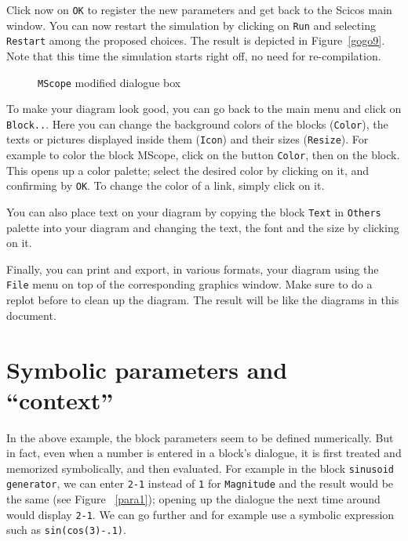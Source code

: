 \documentclass{book}
\begin{document}
Click now on {\tt OK} to register the new parameters and get back to the Scicos main window.
You can now restart the simulation by clicking on {\tt Run} and 
selecting {\tt Restart} among the proposed choices. The result is
depicted in Figure~\ref{gogo9}. Note that
this time the simulation starts right off, no need for re-compilation.
  \begin{figure}[hbtp]
  \centerline{}
  \caption{{\tt MScope} modified dialogue box}
 \label{gogo8}
  \end{figure}



\bigskip

To make your diagram look good, you can go back to the main menu and 
click on {\tt Block..}. Here you can change the background colors of the blocks
({\tt Color}), the texts or pictures displayed inside them ({\tt Icon}) and their
sizes ({\tt Resize}). For example to color the block MScope, click on the
button {\tt Color}, then on the block. This opens up a color palette; 
select the desired color by clicking on it, and confirming by {\tt OK}.
To change the color of a link, simply click on it.

You can also place text on your diagram by copying the block {\tt Text} in
{\tt Others} palette into your diagram and changing the text, the font and
the size by clicking on it.

Finally, you can print and export, in various formats, your diagram using
the {\tt File} menu on top of the corresponding graphics window. Make
sure to do a replot before to clean up the diagram. The result will be
like the diagrams in this document. 

\section{Symbolic parameters and ``context''}
\label{symb}
In the above example, the block parameters seem to be defined numerically. 
But in fact, even when a number is entered
in a block's dialogue, it is first treated and memorized symbolically, and
then evaluated. For example in the block {\tt sinusoid generator}, we can
enter {\tt 2-1} instead of {\tt 1} for {\tt Magnitude} and the result would be the same
(see Figure ~\ref{para1}); opening
up the dialogue the next time around would display {\tt 2-1}. We can go
further and for example use a symbolic expression such as {\tt sin(cos(3)-.1)}.
\end{document}
